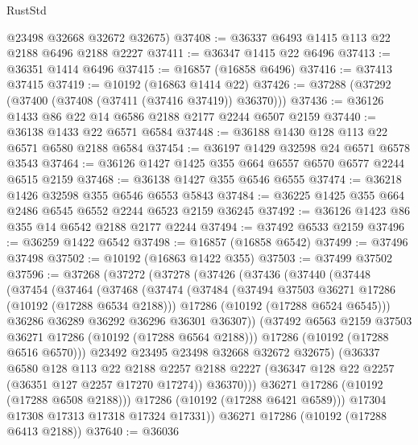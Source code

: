 \begin{lexlean}{RustStd}
\begin{coremodule}
      @23498
      @32668
      @32672
      @32675)
@37408 := @36337 @6493 @1415 @113 @22 @2188 @6496 @2188 @2227
@37411 := @36347 @1415 @22 @6496
@37413 := @36351 @1414 @6496
@37415 := @16857 (@16858 @6496)
@37416 := @37413 @37415
@37419 := @10192 (@16863 @1414 @22)
@37426 := @37288 (@37292 (@37400 (@37408 (@37411 (@37416 @37419)) @36370)))
@37436 := @36126 @1433 @86 @22 @14 @6586 @2188 @2177 @2244 @6507 @2159
@37440 := @36138 @1433 @22 @6571 @6584
@37448 := @36188 @1430 @128 @113 @22 @6571 @6580 @2188 @6584
@37454 := @36197 @1429 @32598 @24 @6571 @6578 @3543
@37464 := @36126 @1427 @1425 @355 @664 @6557 @6570 @6577 @2244 @6515 @2159
@37468 := @36138 @1427 @355 @6546 @6555
@37474 := @36218 @1426 @32598 @355 @6546 @6553 @5843
@37484 := @36225 @1425 @355 @664 @2486 @6545 @6552 @2244 @6523 @2159 @36245
@37492 := @36126 @1423 @86 @355 @14 @6542 @2188 @2177 @2244
@37494 := @37492 @6533 @2159
@37496 := @36259 @1422 @6542
@37498 := @16857 (@16858 @6542)
@37499 := @37496 @37498
@37502 := @10192 (@16863 @1422 @355)
@37503 := @37499 @37502
@37596 := @37268
    (@37272
      (@37278
        (@37426
          (@37436
            (@37440
              (@37448
                (@37454
                  (@37464
                    (@37468
                      (@37474
                        (@37484
                          (@37494 @37503 @36271 @17286 (@10192 (@17288 @6534 @2188)))
                          @17286
                          (@10192 (@17288 @6524 @6545)))
                        @36286
                        @36289
                        @36292
                        @36296
                        @36301
                        @36307))
                    (@37492 @6563 @2159 @37503 @36271 @17286 (@10192 (@17288 @6564 @2188)))
                    @17286
                    (@10192 (@17288 @6516 @6570)))
                  @23492
                  @23495
                  @23498
                  @32668
                  @32672
                  @32675)
                (@36337
                  @6580
                  @128
                  @113
                  @22
                  @2188
                  @2257
                  @2188
                  @2227
                  (@36347 @128 @22 @2257 (@36351 @127 @2257 @17270 @17274))
                  @36370)))
            @36271
            @17286
            (@10192 (@17288 @6508 @2188)))
          @17286
          (@10192 (@17288 @6421 @6589)))
        @17304
        @17308
        @17313
        @17318
        @17324
        @17331))
    @36271
    @17286
    (@10192 (@17288 @6413 @2188))
@37640 := @36036

\end{coremodule}
\end{lexlean}
